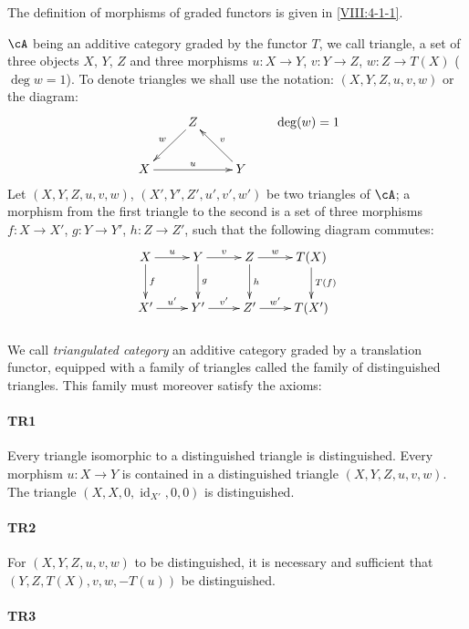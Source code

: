 The definition of morphisms of graded functors is given in
\ref{VIII:4-1-1}.

$\cA$ being an additive category graded by the functor $T$, we
call triangle, a set of three objects $X$, $Y$, $Z$ and three
morphisms $u:X\to Y$, $v:Y\to Z$, $w:Z\to T(X)$ ($\deg w=1$). To denote
triangles we shall use the notation: $(X,Y,Z,u,v,w)$ or the diagram: 
\[\xymatrix{
  & Z \ar[dl]_-w \\
  X \ar[rr]^-u 
    & & Y \ar[lu]_-v 
}\qquad \deg(w)=1
\]
Let $(X,Y,Z,u,v,w)$, $(X',Y',Z',u',v',w')$ be two triangles of $\cA$; a
morphism from the first triangle to the second is a set of three
morphisms $f:X\to X'$, $g:Y\to Y'$, $h:Z\to Z'$, such that the following
diagram commutes: 
\[\xymatrix{
  X \ar[r]^-u \ar[d]^-f 
    & Y \ar[r]^-v \ar[d]^-g 
    & Z \ar[r]^-w \ar[d]^-h 
    & T(X) \ar[d]^-{T(f)} \\
  X' \ar[r]^-{u'} 
    & Y' \ar[r]^-{v'} 
    & Z' \ar[r]^-{w'} 
    & T(X') 
}\]





\subsubsection{}\label{VIII:1-1-1}

We call \emph{triangulated category} an additive category graded
by a translation functor, equipped with a family of triangles called
the family of distinguished triangles. This family must moreover satisfy
the axioms: 


\paragraph{TR1}
\hypertarget{VIII:TR1}{}

Every triangle isomorphic to a distinguished triangle is distinguished. Every
morphism $u:X\to Y$ is contained in a distinguished triangle
$(X,Y,Z,u,v,w)$. The triangle $(X,X,0,\operatorname{id}_{X'},0,0)$ is
distinguished. 


\paragraph{TR2}
\hypertarget{VIII:TR2}{}

For $(X,Y,Z,u,v,w)$ to be distinguished, it is necessary and sufficient that
$(Y,Z,T(X),v,w,-T(u))$ be distinguished. 


\paragraph{TR3}
\hypertarget{VIII:TR3}{}

